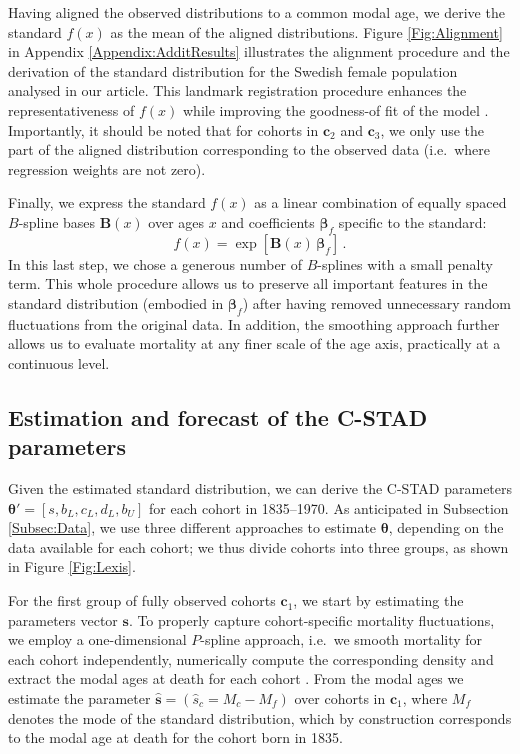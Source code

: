 \documentclass[11pt, a4paper]{article}
\begin{document}
Having aligned the observed distributions to a common modal age, we derive the standard $f(x)$ as the mean of the aligned distributions. Figure \ref{Fig:Alignment} in Appendix \ref{Appendix:AdditResults} illustrates the alignment procedure and the derivation of the standard distribution for the Swedish female population analysed in our article. This landmark registration procedure enhances the representativeness of $f(x)$ while improving the goodness-of fit of the model \cite[for additional details, see][]{basellini2019modelling}. Importantly, it should be noted that for cohorts in $\bm{c}_2$ and $\bm{c}_3$, we only use the part of the aligned distribution corresponding  to the observed data (i.e.~where regression weights are not zero). 

Finally, we express the standard $f(x)$ as a linear combination of equally spaced $B$-spline bases $\bm{B}(x)$ over ages $x$ and coefficients $\bm{\beta}_{f}$ specific to the standard:
%
\begin{equation}\label{Eq:standPsplines}
f(x) = \exp\left[ \bm{B}(x) \, \bm{\beta}_{f} \right] \, .
\end{equation}
In this last step, we chose a generous number of $B$-splines with a small penalty term. This whole procedure allows us to preserve all important features in the standard distribution (embodied in $\bm{\beta}_{f}$) after having removed unnecessary random fluctuations from the original data. In addition, the smoothing approach further allows us to evaluate mortality at any finer scale of the age axis, practically at a continuous level.


\subsection{Estimation and forecast of the C-STAD parameters}
\label{Subsec:EstimForeC-STAD}
Given the estimated standard distribution, we can derive the C-STAD parameters $\bm{\theta}'=\left[s,b_{L},c_{L},d_{L},b_{U}\right]$ for each cohort in 1835--1970. As anticipated in Subsection \ref{Subsec:Data}, we use three different approaches to estimate $\bm{\theta}$, depending on the data available for each cohort; we thus divide cohorts into three groups, as shown in Figure \ref{Fig:Lexis}. 

For the first group of fully observed cohorts $\bm{c}_1$, we start by estimating the parameters vector $\bm{s}$. To properly capture cohort-specific mortality fluctuations, we employ a one-dimensional $P$-spline approach, i.e.~we smooth mortality for each cohort independently, numerically compute the corresponding density and extract the modal ages at death for each cohort \citep[for a similar approach in a period perspective, see][]{ouellette2011changes}. From the modal ages we estimate the parameter $\hat{\bm{s}}=\left(\hat{s}_{c}=M_{c} - M_f\right)$ over cohorts in $\bm{c}_1$, where $M_f$ denotes the mode of the standard distribution, which by construction corresponds to the modal age at death for the cohort born in 1835. \par
\end{document}
